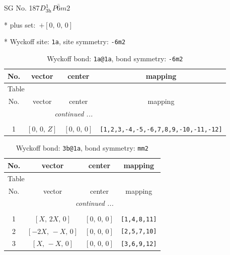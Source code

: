 \documentclass[fleqn,8pt]{jsarticle}
\begin{document}
\setcounter{MaxMatrixCols}{32}

\renewcommand{\tablename}{Table~}
\renewcommand{\figurename}{Figure~}
\begin{center}
\LARGE
SG No. 187\quad$D_{\rm 3h}^{1}$\quad$P\bar{6}m2$\quad[ hexagonal ]
\end{center}

* plus set:\,\,\,$+\left[ 0,\, 0,\, 0 \right]$


* Wyckoff site: {\tt 1a}, site symmetry: {\tt -6m2}
\renewcommand{\arraystretch}{1.2}
\begin{longtable}{cccc}
\caption{Wyckoff bond: {\tt 1a@1a}, bond symmetry: {\tt -6m2}}
 \\
 \hline \hline
No. & vector & center & mapping \\ \hline \endfirsthead

\multicolumn{3}{l}{\tablename\ \thetable{}} \\
 \hline \hline
No. & vector & center & mapping \\ \hline \endhead

 \hline \hline
\multicolumn{3}{r}{\footnotesize\it continued ...} \\ \endfoot

 \hline \hline
\multicolumn{3}{r}{} \\ \endlastfoot

1 & $\left[ 0,\, 0,\, Z \right]$ & $\left[ 0,\, 0,\, 0 \right]$ & {\tt [1,2,3,-4,-5,-6,7,8,9,-10,-11,-12]} \\
\end{longtable}
\renewcommand{\arraystretch}{1.2}
\begin{longtable}{cccc}
\caption{Wyckoff bond: {\tt 3b@1a}, bond symmetry: {\tt mm2}}
 \\
 \hline \hline
No. & vector & center & mapping \\ \hline \endfirsthead

\multicolumn{3}{l}{\tablename\ \thetable{}} \\
 \hline \hline
No. & vector & center & mapping \\ \hline \endhead

 \hline \hline
\multicolumn{3}{r}{\footnotesize\it continued ...} \\ \endfoot

 \hline \hline
\multicolumn{3}{r}{} \\ \endlastfoot

1 & $\left[ X,\, 2 X,\, 0 \right]$ & $\left[ 0,\, 0,\, 0 \right]$ & {\tt [1,4,8,11]} \\ \hline
2 & $\left[ - 2 X,\, - X,\, 0 \right]$ & $\left[ 0,\, 0,\, 0 \right]$ & {\tt [2,5,7,10]} \\ \hline
3 & $\left[ X,\, - X,\, 0 \right]$ & $\left[ 0,\, 0,\, 0 \right]$ & {\tt [3,6,9,12]} \\
\end{longtable}
\end{document}
